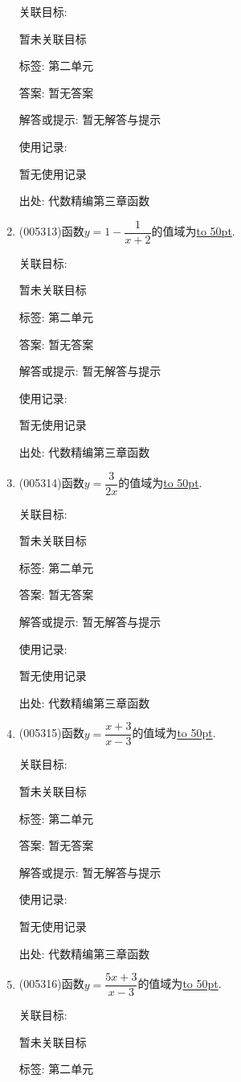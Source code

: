 \documentclass[10pt,a4paper]{article}
\newcommand{\blank}[1]{\underline{\hbox to #1pt{}}}
\begin{document}
\begin{enumerate}[1.]
关联目标:

暂未关联目标



标签: 第二单元

答案: 暂无答案

解答或提示: 暂无解答与提示

使用记录:

暂无使用记录


出处: 代数精编第三章函数
\item { (005313)}函数$y=1-\dfrac 1{x+2}$的值域为\blank{50}.


关联目标:

暂未关联目标



标签: 第二单元

答案: 暂无答案

解答或提示: 暂无解答与提示

使用记录:

暂无使用记录


出处: 代数精编第三章函数
\item { (005314)}函数$y=\dfrac 3{2x}$的值域为\blank{50}.


关联目标:

暂未关联目标



标签: 第二单元

答案: 暂无答案

解答或提示: 暂无解答与提示

使用记录:

暂无使用记录


出处: 代数精编第三章函数
\item { (005315)}函数$y=\dfrac{x+3}{x-3}$的值域为\blank{50}.


关联目标:

暂未关联目标



标签: 第二单元

答案: 暂无答案

解答或提示: 暂无解答与提示

使用记录:

暂无使用记录


出处: 代数精编第三章函数
\item { (005316)}函数$y=\dfrac{5x+3}{x-3}$的值域为\blank{50}.


关联目标:

暂未关联目标



标签: 第二单元


\end{enumerate}
\end{document}
